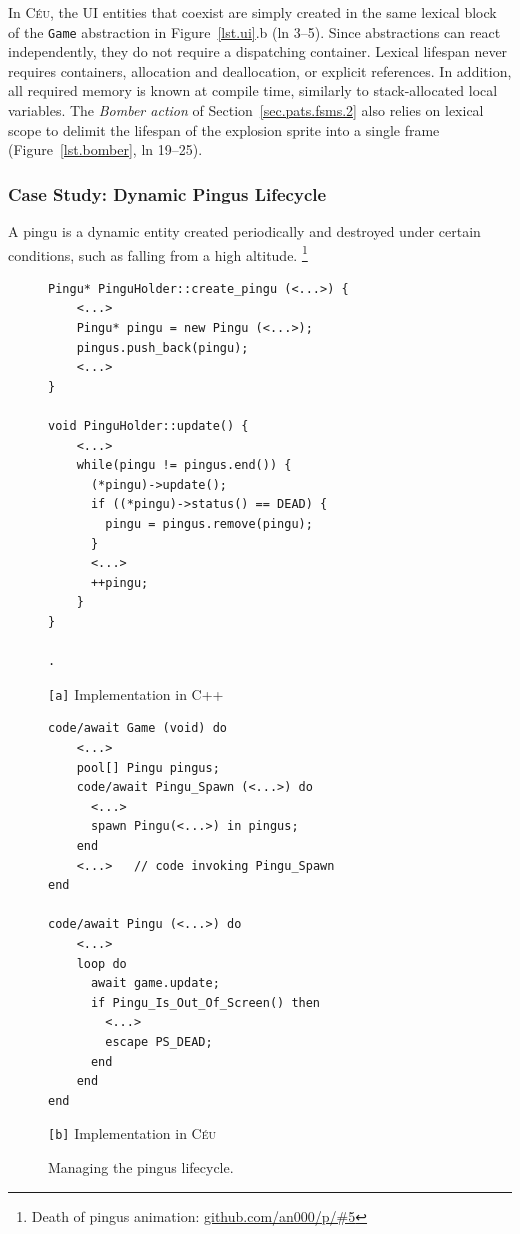 \documentclass[times,twocolumn,final]{elsarticle}
\newcommand{\CEU}{\textsc{C\'{e}u}\xspace}
\newcommand{\code}[1] {{\small{\texttt{#1}}}}
\newcommand{\ax}{\code{[a]}\xspace}
\newcommand{\bx}{\code{[b]}\xspace}
\begin{document}
In \CEU, the UI entities that coexist are simply created in the same lexical
block of the \code{Game} abstraction in Figure~\ref{lst.ui}.b (ln 3--5).
%
Since abstractions can react independently, they do not require a dispatching
container.
%
Lexical lifespan never requires containers, allocation and deallocation, or
explicit references.
In addition, all required memory is known at compile time, similarly to
stack-allocated local variables.
%
The \emph{Bomber action} of Section~\ref{sec.pats.fsms.2} also relies on
lexical scope to delimit the lifespan of the explosion sprite into a single
frame (Figure~\ref{lst.bomber}, ln 19--25).

\subsubsection{Case Study: Dynamic Pingus Lifecycle}
\label{sec.pats.lifespan.2}


A pingu is a dynamic entity created periodically and destroyed under certain
conditions, such as falling from a high altitude.%
\footnote{Death of pingus animation: \url{github.com/an000/p/#5} }
%

\begin{figure}
\begin{minipage}[t]{0.50\linewidth}
\begin{lstlisting}[numbers=right]
Pingu* PinguHolder::create_pingu (<...>) {
    <...>
    Pingu* pingu = new Pingu (<...>);
    pingus.push_back(pingu);
    <...>
}

void PinguHolder::update() {
    <...>
    while(pingu != pingus.end()) {
      (*pingu)->update();
      if ((*pingu)->status() == DEAD) {
        pingu = pingus.remove(pingu);
      }
      <...>
      ++pingu;
    }
}

.
\end{lstlisting}
\centering\small{\ax Implementation in C++}
\end{minipage}
%
\begin{minipage}[t]{0.50\linewidth}
\begin{lstlisting}[xleftmargin=2em]
code/await Game (void) do
    <...>
    pool[] Pingu pingus;
    code/await Pingu_Spawn (<...>) do
      <...>
      spawn Pingu(<...>) in pingus;
    end
    <...>   // code invoking Pingu_Spawn
end

code/await Pingu (<...>) do
    <...>
    loop do
      await game.update;
      if Pingu_Is_Out_Of_Screen() then
        <...>
        escape PS_DEAD;
      end
    end
end
\end{lstlisting}
\centering\small{\bx Implementation in \CEU}
\end{minipage}
\caption{ Managing the pingus lifecycle.
\label{lst.pingus}
}
\end{figure}
\end{document}
